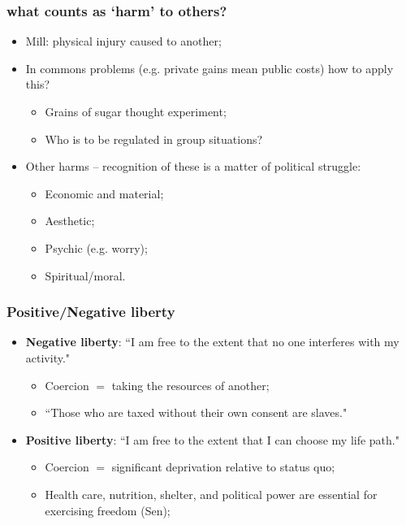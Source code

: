 \documentclass[aspectratio=169]{beamer}
\theoremstyle{principle}
\begin{document}
\begin{frame}
\frametitle{what counts as `harm' to others?}
\begin{itemize}
\item Mill: physical injury caused to another;
\bigskip
\bigskip
\item In commons problems (e.g. private gains mean public costs) how to apply this?
\begin{itemize}
\item Grains of sugar thought experiment;
\item Who is to be regulated in group situations?
\end{itemize}
\bigskip
\bigskip
\item Other harms -- recognition of these is a matter of political struggle:
\begin{itemize}
\item Economic and material;
\item Aesthetic;
\item Psychic (e.g. worry);
\item Spiritual/moral.
\end{itemize}
\end{itemize}

\end{frame}

\begin{frame}
\frametitle{Positive/Negative liberty}
\begin{itemize}
\item \textbf{Negative liberty}: ``I am free to the extent that no one interferes with my activity."
\begin{itemize}
\item Coercion $=$ taking the resources of another;
\item ``Those who are taxed without their own consent are slaves."
\end{itemize}
\bigskip
\bigskip
\item \textbf{Positive liberty}: ``I am free to the extent that I can choose my life path."
\begin{itemize}
\item Coercion $=$ significant deprivation relative to status quo;
\item Health care, nutrition, shelter, and political power are essential for exercising freedom (Sen);
\end{itemize}
\end{itemize}

\end{frame}
\end{document}

